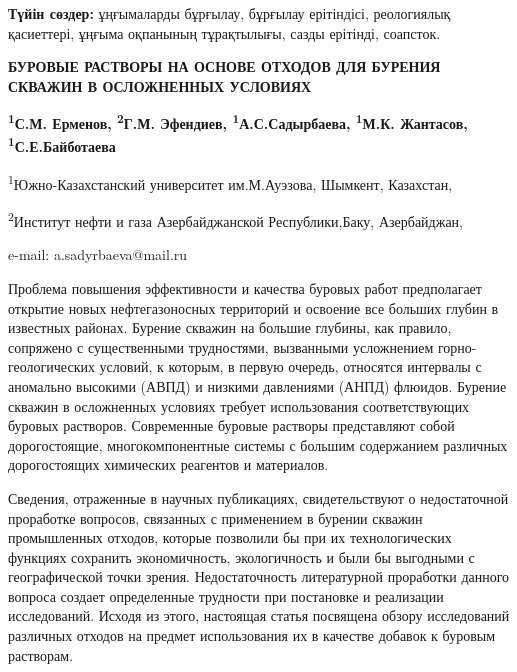 {\bfseries Түйін сөздер:} ұңғымаларды бұрғылау, бұрғылау ерітіндісі,
реологиялық қасиеттері, ұңғыма оқпанының тұрақтылығы, сазды ерітінді,
соапсток.
\begin{articleheader}

{\bfseries БУРОВЫЕ РАСТВОРЫ НА ОСНОВЕ ОТХОДОВ ДЛЯ БУРЕНИЯ СКВАЖИН В
ОСЛОЖНЕННЫХ УСЛОВИЯХ}

{\bfseries \textsuperscript{1}С.М. Ерменов, \textsuperscript{2}Г.М.
Эфендиев, \textsuperscript{1}А.С.Садырбаева\textsuperscript{\envelope },
\textsuperscript{1}М.К. Жантасов, \textsuperscript{1}С.Е.Байботаева}
\end{articleheader}
\begin{affiliation}

\textsuperscript{1}Южно-Казахстанский университет им.М.Ауэзова, Шымкент,
Казахстан,

\textsuperscript{2}Институт нефти и газа Азербайджанской
Республики,Баку, Азербайджан,

e-mail: a.sadyrbaeva@mail.ru
\end{affiliation}

Проблема повышения эффективности и качества буровых работ предполагает
открытие новых нефтегазоносных территорий и освоение все больших глубин
в известных районах. Бурение скважин на большие глубины, как правило,
сопряжено с существенными трудностями, вызванными усложнением
горно-геологических условий, к которым, в первую очередь, относятся
интервалы с аномально высокими (АВПД) и низкими давлениями (АНПД)
флюидов. Бурение скважин в осложненных условиях требует использования
соответствующих буровых растворов. Современные буровые растворы
представляют собой дорогостоящие, многокомпонентные системы с большим
содержанием различных дорогостоящих химических реагентов и материалов.

Сведения, отраженные в научных публикациях, свидетельствуют о
недостаточной проработке вопросов, связанных с применением в бурении
скважин промышленных отходов, которые позволили бы при их
технологических функциях сохранить экономичность, экологичность и были
бы выгодными с географической точки зрения. Недостаточность литературной
проработки данного вопроса создает определенные трудности при постановке
и реализации исследований. Исходя из этого, настоящая статья посвящена
обзору исследований различных отходов на предмет использования их в
качестве добавок к буровым растворам.

